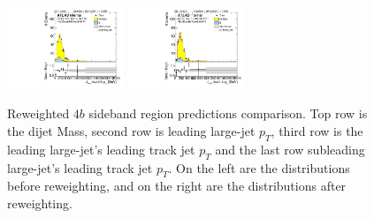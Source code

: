 \begin{figure}[htbp!]
\begin{center}
\includegraphics[width=0.31\textwidth,angle=-90]{figures/boosted/Prereweight/Moriond_FourTag_Sideband_sublHCand_trk0_Pt.pdf}
\includegraphics[width=0.31\textwidth,angle=-90]{figures/boosted/Sideband/b77_FourTag_Sideband_sublHCand_trk0_Pt.pdf}\\
\caption{Reweighted $4b$ sideband region predictions comparison. Top row is the dijet Mass, second row is leading large-\R jet $p_{T}$, third row is the leading large-\R jet's leading track jet $p_T$ and the last row subleading large-\R jet's leading track jet $p_T$. On the left are the distributions before reweighting, and on the right are the distributions after reweighting.}
\label{fig:rw-4b-comp-sb}
\end{center}
\end{figure}


